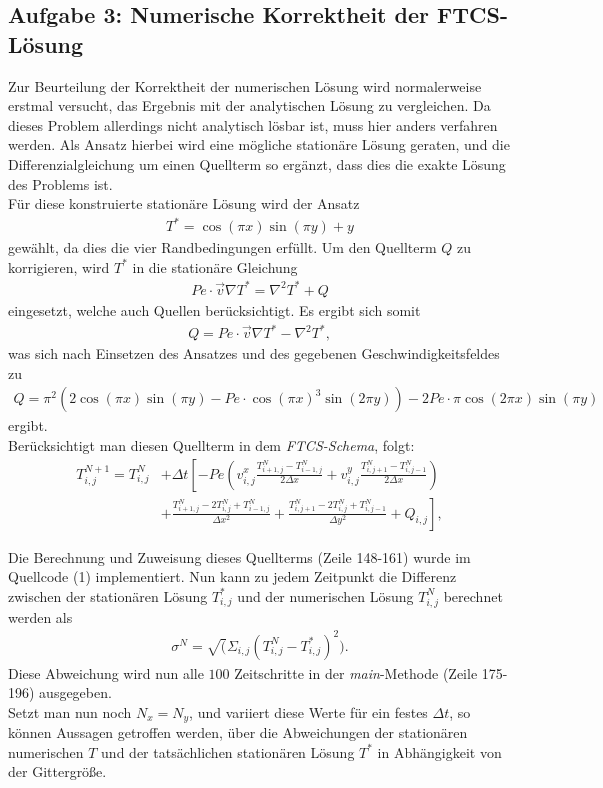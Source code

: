 \documentclass[12pt,a4paper,titlepage,headinclude,bibtotoc]{scrartcl}
\begin{document}
\subsection{Aufgabe 3: Numerische Korrektheit der FTCS-Lösung}
\label{sec:task3}
Zur Beurteilung der Korrektheit der numerischen Lösung wird normalerweise erstmal versucht, das Ergebnis mit der analytischen Lösung zu vergleichen. Da dieses Problem allerdings nicht analytisch lösbar ist, muss hier anders verfahren werden. Als Ansatz hierbei wird eine mögliche stationäre Lösung geraten, und die Differenzialgleichung um einen Quellterm so ergänzt, dass dies die exakte Lösung des Problems ist.\\
Für diese konstruierte stationäre Lösung wird der Ansatz
\begin{align*}
T^* = \cos(\pi x) \sin(\pi y) + y
\end{align*} 
gewählt, da dies die vier Randbedingungen erfüllt.
Um den Quellterm $Q$ zu korrigieren, wird $T^*$ in die stationäre Gleichung
\begin{align*}
Pe \cdot \vec{v} \nabla T^* = \nabla^2 T^* + Q 
\end{align*}
eingesetzt, welche auch Quellen berücksichtigt. Es ergibt sich somit
\begin{align*}
Q = Pe \cdot \vec{v} \nabla T^* - \nabla^2 T^*,
\end{align*}
was sich nach Einsetzen des Ansatzes und des gegebenen Geschwindigkeitsfeldes zu
\begin{align*}
Q = \pi^2 \left(2 \cos(\pi x) \sin(\pi y) - Pe \cdot \cos(\pi x)^3 \sin(2 \pi y) \right) - 2 Pe \cdot \pi \cos(2 \pi x) \sin(\pi y)
\end{align*}
ergibt.\\
Berücksichtigt man diesen Quellterm in dem \textit{FTCS-Schema}, folgt:
\begin{align}
\label{eq:ftcs_source}
T_{i,j}^{N+1} = T_{i,j}^N & + \Delta t \left[ -Pe \left( v^x_{i,j} \frac{T_{i+1,j}^N-T_{i-1,j}^N}{2\Delta x}+v^y_{i,j} \frac{T_{i,j+1}^N-T_{i,j-1}^N}{2\Delta x} \right) \right. \nonumber \\ 
 & \left.+ \frac{ T_{i+1,j}^N - 2 T_{i,j}^N +  T_{i-1,j}^N }{\Delta x^2} 
+ \frac{ T_{i,j+1}^N - 2  T_{i,j}^N + T_{i,j-1}^N}{\Delta y^2} + Q_{i,j} \right],
\end{align}

Die Berechnung und Zuweisung dieses Quellterms (Zeile 148-161) wurde im Quellcode (1) implementiert. 
Nun kann zu jedem Zeitpunkt die Differenz zwischen der stationären Lösung $T_{i,j}^*$ und der numerischen Lösung $T_{i,j}^N$ berechnet werden als
\begin{align*}
\sigma^N = \sqrt(\Sigma_{i,j} (T_{i,j}^N - T_{i,j}^*)^2 ).
\end{align*}
Diese Abweichung wird nun alle $100$ Zeitschritte in der \textit{main}-Methode (Zeile 175-196) ausgegeben.\\
Setzt man nun noch $N_x = N_y$, und variiert diese Werte für ein festes $\Delta t$, so können Aussagen getroffen werden, über die Abweichungen der stationären numerischen $T$ und der tatsächlichen stationären Lösung $T^*$ in Abhängigkeit von der Gittergröße.
\end{document}
